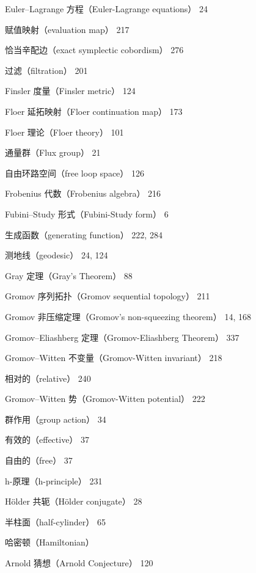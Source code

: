 {\noindent Euler–Lagrange 方程（Euler-Lagrange equations） 24\par
\noindent 赋值映射（evaluation map） 217\par
\noindent 恰当辛配边（exact symplectic cobordism） 276\par
\noindent 过滤（filtration） 201\par
\noindent Finsler 度量（Finsler metric） 124\par
\noindent Floer 延拓映射（Floer continuation map） 173\par
\noindent Floer 理论（Floer theory） 101\par
\noindent 通量群（Flux group） 21\par
\noindent 自由环路空间（free loop space） 126\par
\noindent Frobenius 代数（Frobenius algebra） 216\par
\noindent Fubini–Study 形式（Fubini-Study form） 6\par
\noindent 生成函数（generating function） 222, 284\par
\noindent 测地线（geodesic） 24, 124\par
\noindent Gray 定理（Gray's Theorem） 88\par
\noindent Gromov 序列拓扑（Gromov sequential topology） 211\par
\noindent Gromov 非压缩定理（Gromov's non-squeezing theorem） 14, 168\par
\noindent Gromov–Eliashberg 定理（Gromov-Eliashberg Theorem） 337\par
\noindent Gromov–Witten 不变量（Gromov-Witten invariant） 218\par
\noindent\hspace*{1.5em}相对的（relative） 240\par
\noindent Gromov–Witten 势（Gromov-Witten potential） 222\par
\noindent 群作用（group action） 34\par
\noindent\hspace*{1.5em}有效的（effective） 37\par
\noindent\hspace*{1.5em}自由的（free） 37\par
\noindent h-原理（h-principle） 231\par
\noindent Hölder 共轭（Hölder conjugate） 28\par
\noindent 半柱面（half-cylinder） 65\par
\noindent 哈密顿（Hamiltonian）\par
\noindent\hspace*{1.5em}Arnold 猜想（Arnold Conjecture） 120\par
}
